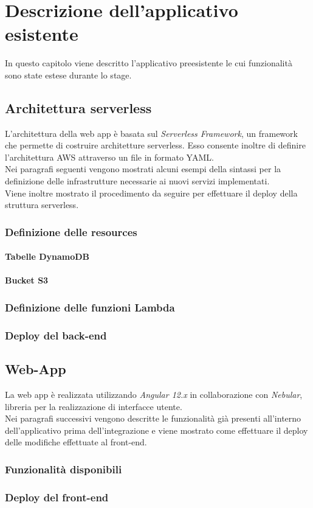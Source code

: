 
\chapter{Descrizione dell'applicativo esistente}
\label{cap:applicazione}

In questo capitolo viene descritto l'applicativo preesistente le cui funzionalità sono state estese durante lo stage.\\

\section{Architettura serverless}
L'architettura della web app è basata sul \emph{Serverless Framework}, un \gls{framework} che permette di costruire architetture \gls{serverless}. Esso consente inoltre di definire l'architettura \gls{AWS} attraverso un file in formato \gls{YAML}. \\
 Nei paragrafi seguenti vengono mostrati alcuni esempi della sintassi per la definizione delle infrastrutture necessarie ai nuovi servizi implementati. \\
 Viene inoltre mostrato il procedimento da seguire per effettuare il \gls{deploy} della struttura \gls{serverless}.
	\subsection{Definizione delle resources}
		\subsubsection{Tabelle DynamoDB}
		\subsubsection{Bucket S3}
	\subsection{Definizione delle funzioni Lambda}
	\subsection{Deploy del back-end}

\section{Web-App}
La web app è realizzata utilizzando \emph{Angular 12.x} in collaborazione con \emph{Nebular}, libreria per la realizzazione di interfacce utente. \\
Nei paragrafi successivi vengono descritte le funzionalità già presenti all'interno dell'applicativo prima dell'integrazione e viene mostrato come effettuare il \gls{deploy} delle modifiche effettuate al front-end.
	\subsection{Funzionalità disponibili}
	\subsection{Deploy del front-end}